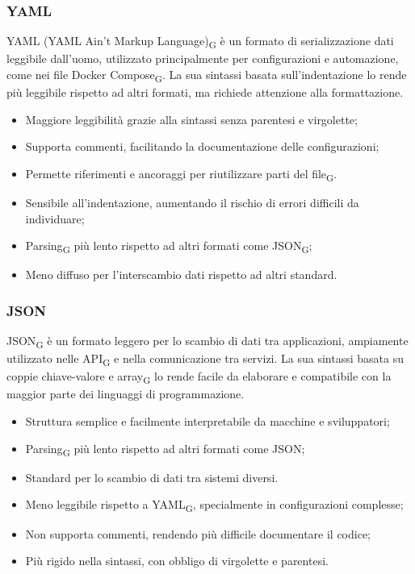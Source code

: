 \subsubsection{YAML}
YAML (YAML Ain’t Markup Language)\textsubscript{G} è un formato di serializzazione dati leggibile dall’uomo, utilizzato principalmente per configurazioni e automazione, come nei file Docker Compose\textsubscript{G}. La sua sintassi basata sull’indentazione lo rende più leggibile rispetto ad altri formati, ma richiede attenzione alla formattazione.
\begin{itemize}
    \item Maggiore leggibilità grazie alla sintassi senza parentesi e virgolette;
    \item Supporta commenti, facilitando la documentazione delle configurazioni;
    \item Permette riferimenti e ancoraggi per riutilizzare parti del file\textsubscript{G}.
\end{itemize}
\begin{itemize}
    \item Sensibile all’indentazione, aumentando il rischio di errori difficili da individuare;
    \item Parsing\textsubscript{G} più lento rispetto ad altri formati come JSON\textsubscript{G};
    \item Meno diffuso per l’interscambio dati rispetto ad altri standard.
\end{itemize}

\subsubsection{JSON}
JSON\textsubscript{G} è un formato leggero per lo scambio di dati tra applicazioni, ampiamente utilizzato nelle API\textsubscript{G} e nella comunicazione tra servizi. La sua sintassi basata su coppie chiave-valore e array\textsubscript{G} lo rende facile da elaborare e compatibile con la maggior parte dei linguaggi di programmazione.

\begin{itemize}
    \item Struttura semplice e facilmente interpretabile da macchine e sviluppatori;
    \item Parsing\textsubscript{G} più lento rispetto ad altri formati come JSON;
    \item Standard per lo scambio di dati tra sistemi diversi.
\end{itemize}
\begin{itemize}
    \item Meno leggibile rispetto a YAML\textsubscript{G}, specialmente in configurazioni complesse;
    \item Non supporta commenti, rendendo più difficile documentare il codice;
    \item Più rigido nella sintassi, con obbligo di virgolette e parentesi.
\end{itemize}